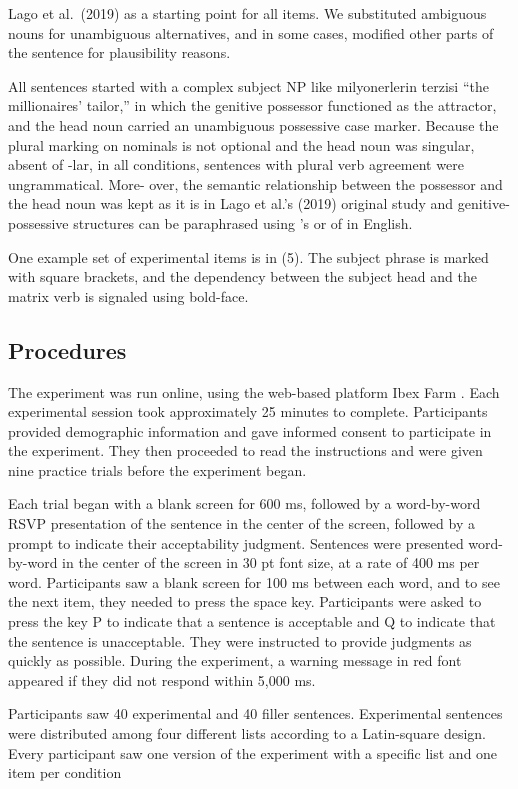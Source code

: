 \documentclass[
  authoryear,
  preprint]{elsarticle}
\begin{document}
Lago et al.~(2019) as a starting point for all items. We substituted
ambiguous nouns for unambiguous alternatives, and in some cases,
modified other parts of the sentence for plausibility reasons.

All sentences started with a complex subject NP like milyonerlerin
terzisi ``the millionaires' tailor,'' in which the genitive possessor
functioned as the attractor, and the head noun carried an unambiguous
possessive case marker. Because the plural marking on nominals is not
optional and the head noun was singular, absent of -lar, in all
conditions, sentences with plural verb agreement were ungrammatical.
More- over, the semantic relationship between the possessor and the head
noun was kept as it is in Lago et al.'s (2019) original study and
genitive-possessive structures can be paraphrased using 's or of in
English.

One example set of experimental items is in (5). The subject phrase is
marked with square brackets, and the dependency between the subject head
and the matrix verb is signaled using bold-face.

\subsection{Procedures}\label{procedures}

The experiment was run online, using the web-based platform Ibex Farm
\citep{Drummond2013}. Each experimental session took approximately 25
minutes to complete. Participants provided demographic information and
gave informed consent to participate in the experiment. They then
proceeded to read the instructions and were given nine practice trials
before the experiment began.

Each trial began with a blank screen for 600 ms, followed by a
word-by-word RSVP presentation of the sentence in the center of the
screen, followed by a prompt to indicate their acceptability judgment.
Sentences were presented word-by-word in the center of the screen in 30
pt font size, at a rate of 400 ms per word. Participants saw a blank
screen for 100 ms between each word, and to see the next item, they
needed to press the space key. Participants were asked to press the key
P to indicate that a sentence is acceptable and Q to indicate that the
sentence is unacceptable. They were instructed to provide judgments as
quickly as possible. During the experiment, a warning message in red
font appeared if they did not respond within 5,000 ms.

Participants saw 40 experimental and 40 filler sentences. Experimental
sentences were distributed among four different lists according to a
Latin-square design. Every participant saw one version of the experiment
with a specific list and one item per condition
\end{document}
